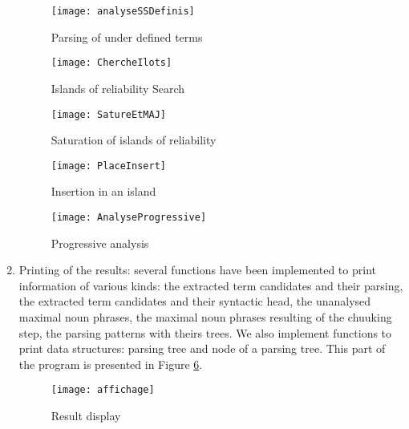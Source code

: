 \begin{enumerate}
\begin{figure}[!htbp]
\begin{center}
\texttt{[image: analyseSSDefinis]}
\caption{Parsing of under defined terms}\label{ANaSSDef}
\end{center}
\end{figure}


\begin{figure}[!htbp]
\begin{center}
\texttt{[image: ChercheIlots]}
\caption{Islands of reliability Search}\label{CherIlo}
\end{center}
\end{figure}

\begin{figure}[!htbp]
\begin{center}
\texttt{[image: SatureEtMAJ]}
\caption{Saturation of islands of reliability}\label{SatetMaj}
\end{center}
\end{figure}

\begin{figure}[!htbp]
\begin{center}
\texttt{[image: PlaceInsert]}
\caption{Insertion in an island}\label{PlaceIns}
\end{center}
\end{figure}

\begin{figure}[!htbp]
\begin{center}
\texttt{[image: AnalyseProgressive]}
\caption{Progressive analysis}\label{AnProg}
\end{center}
\end{figure}


\item Printing of the results: several functions have been implemented
  to print information of various kinds: the extracted term candidates and
  their parsing, the extracted term candidates and
  their syntactic head, the unanalysed maximal noun phrases, the
  maximal noun phrases resulting of the chuuking step, the parsing
  patterns with theirs trees. We also implement functions to print
  data structures: parsing tree and node of a parsing tree. This part
  of the program is presented in Figure \ref{Affich}.
\begin{figure}[!htbp]
\begin{center}
\texttt{[image: affichage]}
\caption{Result display}\label{Affich}
\end{center}
\end{figure}
\end{enumerate}
\fussy

